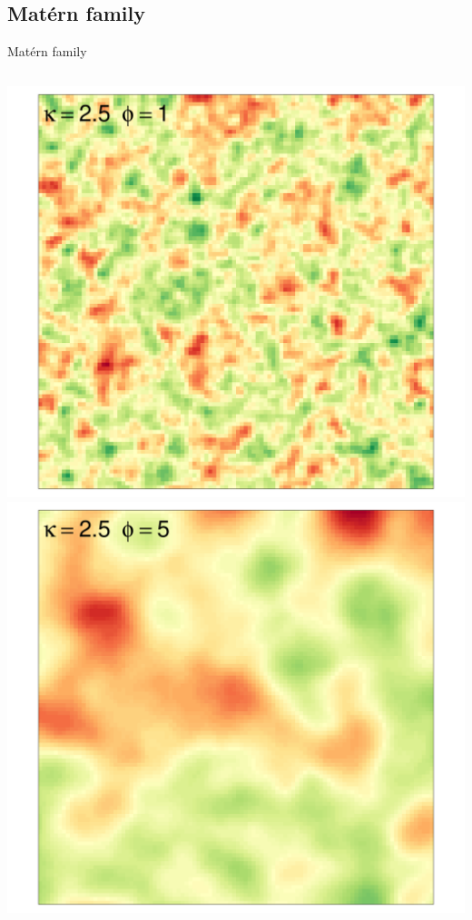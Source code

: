 \documentclass[
  ignorenonframetext,
]{beamer}
\begin{document}
\hypertarget{matuxe9rn-family-4}{%
\subsection{Matérn family}\label{matuxe9rn-family-4}}

\begin{frame}{Matérn family}
\small

\begin{columns}[T]
\begin{column}{0.33\textwidth}
\includegraphics{Lecture_1_files/figure-beamer/unnamed-chunk-39-1.pdf}
\includegraphics{Lecture_1_files/figure-beamer/unnamed-chunk-40-1.pdf}
\end{column}


\end{columns}
\end{frame}
\end{document}

